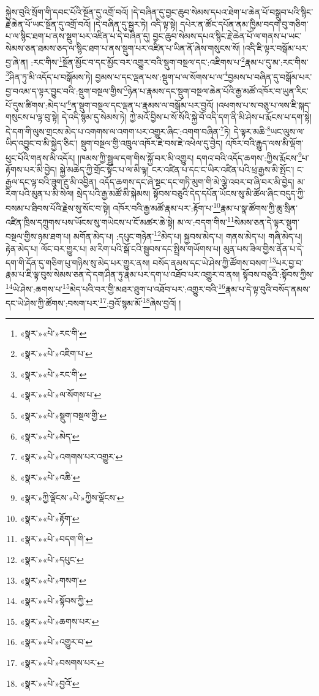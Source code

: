 སྐྱེས་བུའི་སྲོག་གི་དབང་པོའི་སྔོན་དུ་འགྲོ་བའོ། །དེ་བཞིན་དུ་བྱང་ཆུབ་སེམས་དཔའ་ཐེག་པ་ཆེན་པོ་བསྒྲུབ་པའི་སྙིང་རྗེ་ཆེན་པོ་ཡང་སྔོན་དུ་འགྲོ་བའོ། །དེ་བཞིན་དུ་སྦྱར་ཏེ། འདི་ལྟ་སྟེ། དཔེར་ན་ཚོང་དཔོན་ནམ་ཁྱིམ་བདག་བུ་གཅིག་པ་ལ་སྙིང་ཐག་པ་ནས་སྡུག་པར་འཛིན་པ་དེ་བཞིན་དུ། བྱང་ཆུབ་སེམས་དཔའ་སྙིང་རྗེ་ཆེན་པོ་ལ་གནས་པ་ཡང་སེམས་ཅན་ཐམས་ཅད་ལ་སྙིང་ཐག་པ་ནས་སྡུག་པར་འཛིན་པ་ཡིན་ནོ་ཞེས་གསུངས་སོ། །འདི་ཇི་ལྟར་བསྒོམ་པར་བྱ་ཞེ་ན། :རང་གིས་\footnote{«སྣར་»«པེ་»རང་གི་}སྔོན་མྱོང་བ་དང་མྱོང་བར་འགྱུར་བའི་སྡུག་བསྔལ་དང་:འཇིགས་པ་\footnote{«སྣར་»«པེ་»འཇིག་པ་}རྣམ་པ་དུ་མ་:རང་གིས་\footnote{«སྣར་»«པེ་»རང་གི་}ཤིན་ཏུ་མི་འདོད་པ་བསྒོམས་ཏེ། བྱམས་པ་དང་ལྡན་པས་:སྡུག་པ་ལ་སོགས་པ་ལ་\footnote{«སྣར་»«པེ་»ལ་སོགས་པ་}བྱམས་པ་བཞིན་དུ་བསྒོམ་པར་བྱ་བའམ་ད་ལྟར་བྱུང་བའི་:སྡུག་བསྔལ་གྱིས་\footnote{«སྣར་»«པེ་»སྡུག་བསྔལ་གྱི་}ཉེན་པ་རྣམས་དང་སྡུག་བསྔལ་ཆེན་པོའི་རྒྱ་མཚོ་འཁོར་བ་ཡུན་རིང་པོ་དུས་ཚིགས་:མེད་པ་\footnote{«སྣར་»«པེ་»མེད་}ན་སྡུག་བསྔལ་དང་ལྡན་པ་རྣམས་ལ་བསྒོམ་པར་བྱའོ། །འཕགས་པ་ས་བཅུ་པ་ལས་ཇི་སྐད་གསུངས་པ་ལྟ་བུ་སྟེ། དེ་འདི་སྙམ་དུ་སེམས་ཏེ། ཀྱེ་མའོ་བྱིས་པ་སོ་སོའི་སྐྱེ་བོ་འདི་དག་ནི་མི་ཤེས་པ་རྨོངས་པ་དག་སྟེ། དེ་དག་གི་ལུས་གྲངས་མེད་པ་འགགས་ལ་འགག་པར་འགྱུར་ཞིང་:འགག་བཞིན་\footnote{«སྣར་»«པེ་»འགགས་པར་འགྱུར་}ཏེ། དེ་ལྟར་མཆི་\footnote{«སྣར་»«པེ་»འཆི་}ཡང་ལུས་ལ་ཡིད་འབྱུང་བ་མི་སྐྱེད་ཅིང་། སྡུག་བསྔལ་གྱི་འཁྲུལ་འཁོར་ཇེ་བས་ཇེ་འཕེལ་དུ་བྱེད། འཁོར་བའི་རྒྱུད་ལས་མི་ལྡོག་ཕུང་པོའི་གནས་མི་འདོར། །ཁམས་ཀྱི་སྦྲུལ་དག་གིས་སྐྱོ་བར་མི་འགྱུར། དགའ་བའི་འདོད་ཆགས་:ཀྱིས་རྨོངས་\footnote{«སྣར་»ཀྱི་ལྡོངས་«པེ་»ཀྱིས་ལྡོངས་}པ་རྟོགས་པར་མི་བྱེད། སྐྱེ་མཆེད་ཀྱི་གྲོང་སྟོང་པ་ལ་མི་ལྟ། ངར་འཛིན་པ་དང་ང་ཡིར་འཛིན་པའི་ཕྲ་རྒྱས་མི་སྤོང་། ང་རྒྱལ་དང་ལྟ་བའི་ཟུག་རྔུ་མི་འབྱིན། འདོད་ཆགས་དང་ཞེ་སྡང་དང་གཏི་མུག་གི་མེ་ལྕེ་འབར་བ་ཞི་བར་མི་བྱེད། མ་རིག་པའི་མུན་པ་མི་སེལ། སྲེད་པའི་རྒྱ་མཚོ་མི་སྐེམས། སྟོབས་བཅུའི་དེད་དཔོན་ཡོངས་སུ་མི་ཚོལ་ཞིང་བདུད་ཀྱི་བསམ་པ་ཐིབས་པོའི་རྗེས་སུ་སོང་བ་སྟེ། འཁོར་བའི་རྒྱ་མཚོ་རྣམ་པར་:རྟོག་པ་\footnote{«སྣར་»«པེ་»རྟོག་}རྣམ་པ་སྣ་ཚོགས་ཀྱི་ཆུ་སྲིན་འཛིན་ཁྲིས་དཀྲུགས་པས་ཡོངས་སུ་གཡེངས་པ་ངོ་མཚར་ཆེ་སྟེ། མ་ལ་:བདག་གིས་\footnote{«སྣར་»«པེ་»བདག་གི་}སེམས་ཅན་དེ་ལྟར་སྡུག་བསྔལ་གྱིས་ཉམ་ཐག་པ། མགོན་མེད་པ། :དཔུང་གཉེན་\footnote{«སྣར་»«པེ་»དཔུང་}མེད་པ། སྐྱབས་མེད་པ། གནས་མེད་པ། གཞི་མེད་པ། རྟེན་མེད་པ། ལོང་བར་གྱུར་པ། མ་རིག་པའི་སྒོ་ངའི་སྦུབས་དང་སྤྲིས་གཡོགས་པ། མུན་པས་ཟིལ་གྱིས་ནོན་པ་དེ་དག་གི་དོན་དུ་གཅིག་པུ་གཉིས་སུ་མེད་པར་གྱུར་ནས། བསོད་ནམས་དང་ཡེ་ཤེས་ཀྱི་ཚོགས་བསག་\footnote{«སྣར་»«པེ་»གསག་}པར་བྱ་བ་རྣམ་པ་ཇི་ལྟ་བུས་སེམས་ཅན་དེ་དག་ཤིན་ཏུ་རྣམ་པར་དག་པ་འཐོབ་པར་འགྱུར་བ་ནས། སྟོབས་བཅུའི་:སྟོབས་ཀྱིས་\footnote{«སྣར་»«པེ་»སྟོབས་ཀྱི་}ཡེ་ཤེས་:ཆགས་པ་\footnote{«སྣར་»«པེ་»ཆགས་པར་}མེད་པའི་བར་གྱི་མཐར་ཐུག་པ་འཐོབ་པར་:འགྱུར་བའི་\footnote{«སྣར་»«པེ་»འགྱུར་བ་}རྣམ་པ་དེ་ལྟ་བུའི་བསོད་ནམས་དང་ཡེ་ཤེས་ཀྱི་ཚོགས་:བསག་པར་\footnote{«སྣར་»«པེ་»བསགས་པར་}:བྱའོ་སྙམ་མོ་\footnote{«སྣར་»«པེ་»བྱའོ་}ཞེས་བྱའོ། །
